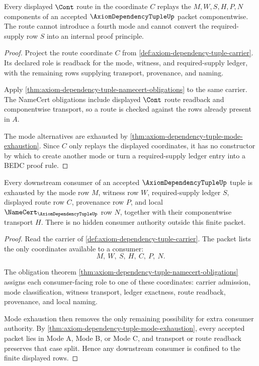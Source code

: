 \begin{theorem}
\label{thm:axiom-dependency-tuple-route-nonexport}
Every displayed $\Cont$ route in the coordinate $C$ replays the
$M,W,S,H,P,N$ components of an accepted $\AxiomDependencyTupleUp$ packet
componentwise. The route cannot introduce a fourth mode and cannot convert the
required-supply row $S$ into an internal proof principle.
\end{theorem}
\begin{proof}
Project the route coordinate $C$ from
\autoref{def:axiom-dependency-tuple-carrier}. Its declared role is readback for
the mode, witness, and required-supply ledger, with the remaining rows supplying
transport, provenance, and naming.

Apply \autoref{thm:axiom-dependency-tuple-namecert-obligations} to the same
carrier. The NameCert obligations include displayed $\Cont$ route readback and
componentwise transport, so a route is checked against the rows already present
in $A$.

The mode alternatives are exhausted by
\autoref{thm:axiom-dependency-tuple-mode-exhaustion}. Since $C$ only replays the
displayed coordinates, it has no constructor by which to create another mode or
turn a required-supply ledger entry into a BEDC proof rule.
\end{proof}

\begin{theorem}
\label{thm:axiom-dependency-tuple-consumer-exhaustion}
Every downstream consumer of an accepted $\AxiomDependencyTupleUp$ tuple is
exhausted by the mode row $M$, witness row $W$, required-supply ledger $S$,
displayed route row $C$, provenance row $P$, and local
$\NameCert_{\AxiomDependencyTupleUp}$ row $N$, together with their
componentwise transport $H$. There is no hidden consumer authority outside this
finite packet.
\end{theorem}
\begin{proof}
Read the carrier of \autoref{def:axiom-dependency-tuple-carrier}. The packet
lists the only coordinates available to a consumer:
$$
M,\ W,\ S,\ H,\ C,\ P,\ N.
$$

The obligation theorem
\autoref{thm:axiom-dependency-tuple-namecert-obligations} assigns each
consumer-facing role to one of these coordinates: carrier admission, mode
classification, witness transport, ledger exactness, route readback,
provenance, and local naming.

Mode exhaustion then removes the only remaining possibility for extra consumer
authority. By \autoref{thm:axiom-dependency-tuple-mode-exhaustion}, every
accepted packet lies in Mode A, Mode B, or Mode C, and transport or route
readback preserves that case split. Hence any downstream consumer is confined to
the finite displayed rows.
\end{proof}


